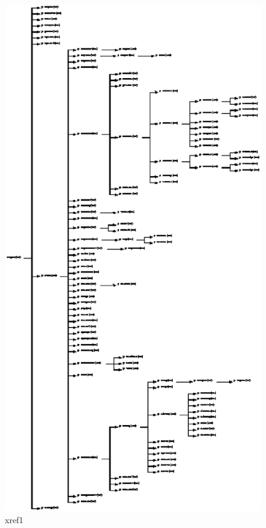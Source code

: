 \begin{figure}
\begin{center}
\hspace{-1cm}
\includegraphics{xref4.fixed.eps}
\end{center}
\caption{xref1}  \label{grid}
\end{figure}



